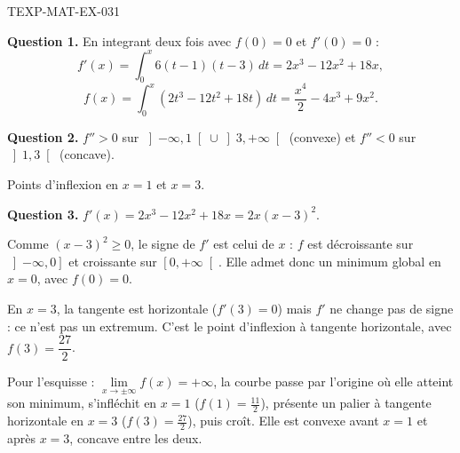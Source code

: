 \begin{corrige}{TEXP-MAT-EX-031}

\textbf{Question 1.} En integrant deux fois avec $f(0)=0$ et $f'(0)=0$ :
\[ f'(x) = \int_0^x 6(t-1)(t-3)\,dt = 2x^3 - 12x^2 + 18x, \]
\[ f(x) = \int_0^x (2t^3 - 12t^2 + 18t)\,dt = \frac{x^4}{2} - 4x^3 + 9x^2. \]


\textbf{Question 2.} $f'' > 0$ sur $\left]-\infty, 1\right[ \cup \left]3, +\infty\right[$ (convexe) et $f'' < 0$ sur $\left]1, 3\right[$ (concave).

Points d'inflexion en $x = 1$ et $x = 3$.

\textbf{Question 3.} $f'(x) = 2x^3 - 12x^2 + 18x = 2x(x-3)^2$.

Comme $(x-3)^2 \geq 0$, le signe de $f'$ est celui de $x$ : $f$ est décroissante
sur $\left]-\infty,0\right]$ et croissante sur $\left[0,+\infty\right[$. Elle admet
donc un minimum global en $x=0$, avec $f(0)=0$.

En $x=3$, la tangente est horizontale ($f'(3)=0$) mais $f'$ ne change pas de
signe : ce n'est pas un extremum. C'est le point d'inflexion à tangente
horizontale, avec $f(3)=\dfrac{27}{2}$.

Pour l'esquisse : $\lim\limits_{x\to\pm\infty} f(x) = +\infty$, la courbe passe par
l'origine où elle atteint son minimum, s'infléchit en $x=1$ ($f(1)=\frac{11}{2}$),
présente un palier à tangente horizontale en $x=3$ ($f(3)=\frac{27}{2}$), puis
croît. Elle est convexe avant $x=1$ et après $x=3$, concave entre les deux.

\end{corrige}
